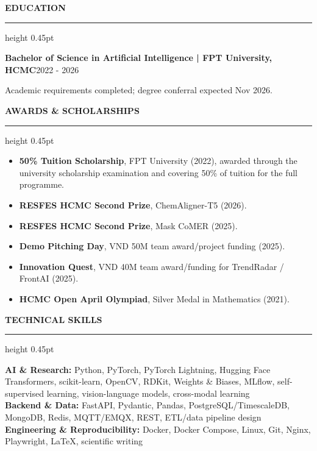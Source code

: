 \documentclass[10pt]{article}
\newcommand{\cvsection}[1]{%
    \vspace{6.2pt}%
    {\color{accent}\bfseries\small #1}\par
    \vspace{2.3pt}%
    {\color{rulegray}\hrule height 0.45pt}\vspace{4.0pt}%
}
\newcommand{\entry}[2]{%
    \textbf{#1}\hfill {\color{muted}\small #2}\par
}
\begin{document}
\cvsection{EDUCATION}
\entry{Bachelor of Science in Artificial Intelligence | FPT University, HCMC}{2022 - 2026}
{\small Academic requirements completed; degree conferral expected Nov 2026.}

\cvsection{AWARDS \& SCHOLARSHIPS}
\begin{itemize}
    \item \textbf{50\% Tuition Scholarship}, FPT University (2022), awarded through the university scholarship examination and covering 50\% of tuition for the full programme.
    \item \textbf{RESFES HCMC Second Prize}, ChemAligner-T5 (2026).
    \item \textbf{RESFES HCMC Second Prize}, Mask CoMER (2025).
    \item \textbf{Demo Pitching Day}, VND 50M team award/project funding (2025).
    \item \textbf{Innovation Quest}, VND 40M team award/funding for TrendRadar / FrontAI (2025).
    \item \textbf{HCMC Open April Olympiad}, Silver Medal in Mathematics (2021).
\end{itemize}

\cvsection{TECHNICAL SKILLS}
{\small
\textbf{AI \& Research:} Python, PyTorch, PyTorch Lightning, Hugging Face Transformers, scikit-learn, OpenCV, RDKit, Weights \& Biases, MLflow, self-supervised learning, vision-language models, cross-modal learning\\
\textbf{Backend \& Data:} FastAPI, Pydantic, Pandas, PostgreSQL/TimescaleDB, MongoDB, Redis, MQTT/EMQX, REST, ETL/data pipeline design\\
\textbf{Engineering \& Reproducibility:} Docker, Docker Compose, Linux, Git, Nginx, Playwright, LaTeX, scientific writing
}
\end{document}
